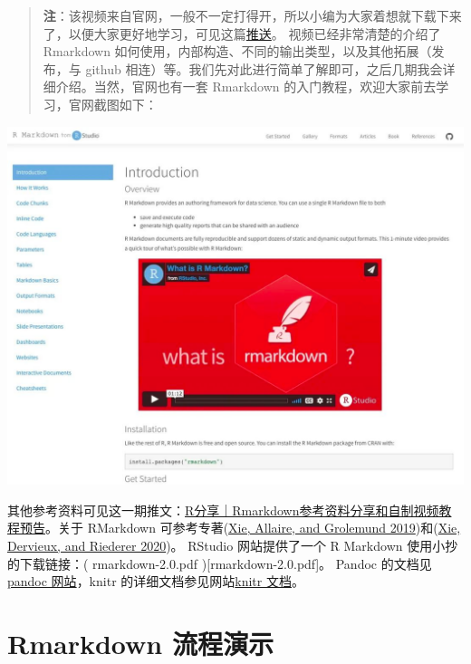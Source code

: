 \documentclass[
]{book}
\begin{document}
\begin{quote}
\textbf{注}：该视频来自官网，一般不一定打得开，所以小编为大家着想就下载下来了，以便大家更好地学习，可见这篇\href{https://mp.weixin.qq.com/s/aPqjLILQvnRaM6S7j7zsLQ}{推送}。
视频已经非常清楚的介绍了 Rmarkdown
如何使用，内部构造、不同的输出类型，以及其他拓展（发布，与 github
相连）等。我们先对此进行简单了解即可，之后几期我会详细介绍。当然，官网也有一套
Rmarkdown 的入门教程，欢迎大家前去学习，官网截图如下：
\end{quote}

\includegraphics{images/paste-3BB6003B.png}

其他参考资料可见这一期推文：\href{http://mp.weixin.qq.com/s?__biz=MzI1NjUwMjQxMQ==\&mid=2247490959\&idx=1\&sn=2374d35aa12a64bd00caea0bf424bbd0\&chksm=ea24e26bdd536b7d2263b6e779a00f072f2e42f29346ab13a9ed4252144dc6d7e964c7ef7d52\&scene=21\#wechat_redirect}{R分享｜Rmarkdown参考资料分享和自制视频教程预告}。关于
RMarkdown 可参考专著(\href{https://www.math.pku.edu.cn/teachers/lidf/docs/Rbook/html/_Rbook/rmarkdown.html\#ref-Xie2019:rmarkdown}{Xie, Allaire, and Grolemund
2019})和(\href{https://www.math.pku.edu.cn/teachers/lidf/docs/Rbook/html/_Rbook/rmarkdown.html\#ref-Xie2020:rmd-cook}{Xie,
Dervieux, and Riederer
2020})。
RStudio 网站提供了一个 R Markdown 使用小抄的下载链接：(
rmarkdown-2.0.pdf ){[}rmarkdown-2.0.pdf{]}。 Pandoc 的文档见\href{https://www.pandoc.org/}{pandoc
网站}，knitr
的详细文档参见网站\href{http://yihui.name/knitr/}{knitr 文档}。

\hypertarget{rmarkdown-ux6d41ux7a0bux6f14ux793a}{%
\section{Rmarkdown 流程演示}\label{rmarkdown-ux6d41ux7a0bux6f14ux793a}}
\end{document}
